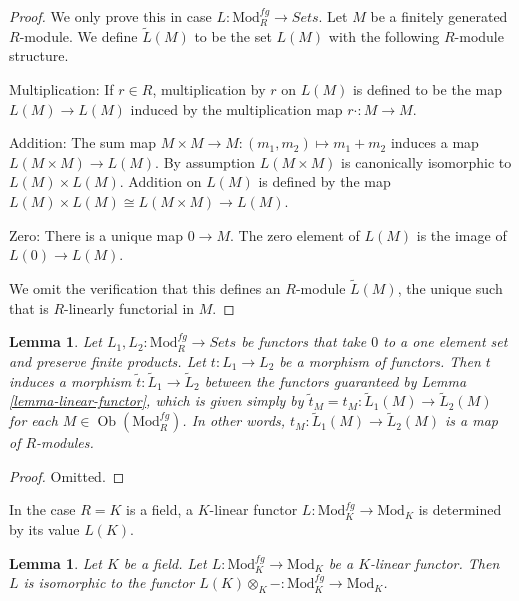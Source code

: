 \documentclass{stacks-project}
\theoremstyle{plain}
\newtheorem{lemma}[subsection]{Lemma}
\theoremstyle{definition}
\theoremstyle{remark}
\numberwithin{equation}{subsection}
\def\Ob{\mathop{\mathrm{Ob}}\nolimits}
\begin{document}
\begin{proof}
We only prove this in case $L: \text{Mod}^{fg}_R \to \textit{Sets}$.
Let $M$ be a finitely generated $R$-module. We define $\widetilde{L}(M)$ to be
the set $L(M)$ with the following $R$-module structure.

\medskip\noindent
Multiplication: If $r \in R$, multiplication by $r$ on $L(M)$ is defined to be
the map $L(M) \to L(M)$ induced by the multiplication map
$r \cdot : M \to M$.

\medskip\noindent
Addition: The sum map $M \times M \to M: (m_1, m_2) \mapsto m_1 + m_2$
induces a map $L(M \times M) \to L(M)$. By assumption $L(M \times M)$
is canonically isomorphic to $L(M) \times L(M)$.  Addition on $L(M)$ is defined
by the map $L(M) \times L(M) \cong L(M \times M) \to L(M)$.

\medskip\noindent
Zero: There is a unique map $0 \to M$. The zero element of $L(M)$ is
the image of $L(0) \to L(M)$.

\medskip\noindent
We omit the verification that this defines an $R$-module $\widetilde{L}(M)$,
the unique such that is $R$-linearly functorial in $M$.
\end{proof}

\begin{lemma}
\label{lemma-morphism-linear-functors}
Let $L_1, L_2: \text{Mod}^{fg}_R \to \textit{Sets}$ be
functors that take $0$ to a one element set and preserve finite products.
Let $t : L_1 \to L_2$ be a morphism of functors. Then $t$ induces a morphism
$\widetilde{t} : \widetilde{L}_1 \to \widetilde{L}_2$ between the
functors guaranteed by Lemma \ref{lemma-linear-functor}, which is given simply
by $\widetilde{t}_M = t_M: \widetilde{L}_1(M) \to \widetilde{L}_2(M)$
for each $M \in \Ob(\text{Mod}^{fg}_R)$. In other words,
$t_M: \widetilde{L}_1(M) \to \widetilde{L}_2(M)$ is a map of $R$-modules.
\end{lemma}

\begin{proof}
Omitted.
\end{proof}

\noindent
In the case $R = K$ is a field, a $K$-linear functor
$L : \text{Mod}^{fg}_K \to \text{Mod}_K$ is determined by its value $L(K)$.

\begin{lemma}
\label{lemma-linear-functor-over-field}
Let $K$ be a field. Let $L: \text{Mod}^{fg}_K \to
\text{Mod}_K$ be a $K$-linear functor.  Then $L$ is isomorphic to the
functor $L(K) \otimes_K - : \text{Mod}^{fg}_K \to
\text{Mod}_K$.
\end{lemma}
\end{document}
